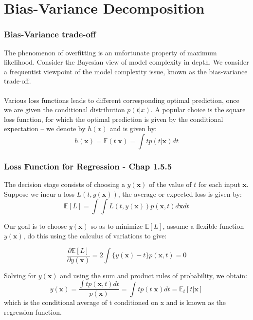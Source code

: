 \documentclass{beamer}
\begin{document}
\section{Bias-Variance Decomposition} %

\begin{frame}
\frametitle{Bias-Variance trade-off}
The phenomenon of overfitting is an unfortunate property of maximum likelihood. Consider the Bayesian view of model complexity in depth. We consider a frequentist viewpoint of the model complexity issue, known as the bias-variance trade-off. \\~\\


Various loss functions leads to different  corresponding optimal prediction, once we are given the conditional distribution $p(t|x)$. A popular choice is  the square loss function, for which the optimal prediction is given by the conditional expectation -- we denote by $h(x)$ and is given by:
\begin{equation}
h(\bm{x})=\mathbb{E}(t|\bm{x})=\int tp(t|\bm{x})dt
\end{equation}

\end{frame}


\begin{frame}
\frametitle{Loss Function for Regression - Chap 1.5.5}
The decision stage consists of choosing a $y(\bm{x})$ of the value of $t$ for each input $\bm{x}$. Suppose we incur a loss $L(t,y(\bm{x}))$, the average or expected loss is given by:
\begin{equation}
\mathbb{E}[L]=\int \int L(t,y(\bm{x}))p(\bm{x},t)d\bm{x}dt
\end{equation}

Our goal is to choose $y(\bm{x})$ so as to minimize $\mathbb{E}[L]$, assume a flexible function $y(\bm{x})$, do this using the calculus of variations to give:

\begin{equation}
\frac{\partial \mathbb{E}[L]}{\partial y(\bm{x})} = 2 \int \{y(\bm{x})-t\}p(\bm{x},t)=0
\end{equation}

Solving for $y(\bm{x})$ and using the sum and product rules of probability, we obtain:
\begin{equation}
y(\bm{x})=\frac{\int tp(\bm{x},t)dt}{p(\bm{x})}=\int tp(t|\bm{x})dt=\mathbb{E}_t[t|\bm{x}]
\end{equation}
which is the conditional average of t conditioned on x and is known as the regression function.
\end{frame}
\end{document}
